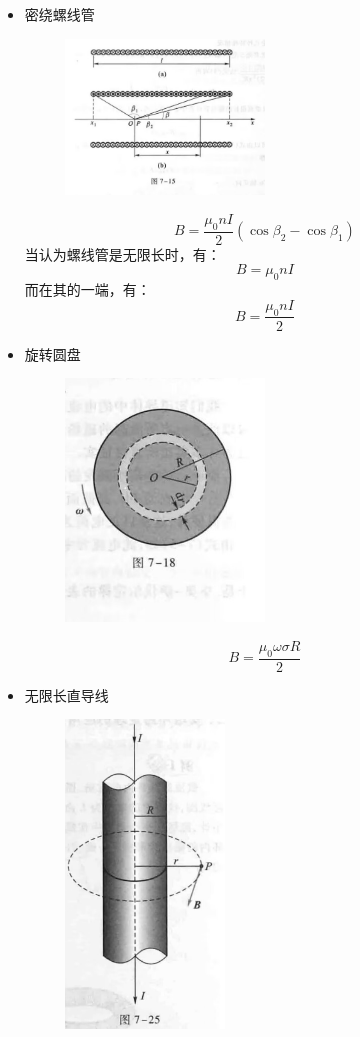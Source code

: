 \documentclass{ctexart}
\begin{document}
\begin{itemize}
    \item 密绕螺线管
    \begin{figure}[H]
        \centering
        \includegraphics[width=0.5\textwidth]{img/7-15.jpg}
    \end{figure}
    $$
        B = \frac{\mu_0 nI}{2} (\cos \beta_2 - \cos \beta_1)
    $$
    当认为螺线管是无限长时，有：
    $$
        B = \mu_0 n I
    $$
    而在其的一端，有：
    $$
        B = \frac{\mu_0 n I}{2} 
    $$
    \item 旋转圆盘
    \begin{figure}[H]
        \centering
        \includegraphics[width=0.5\textwidth]{img/7-18.jpg}
    \end{figure}
    $$
        B = \frac{\mu_0 \omega \sigma R}{2}
    $$
    \item 无限长直导线
    \begin{figure}[H]
        \centering
        \includegraphics[width=0.4\textwidth]{img/7-25.jpg}

\end{figure}
\end{itemize}
\end{document}
